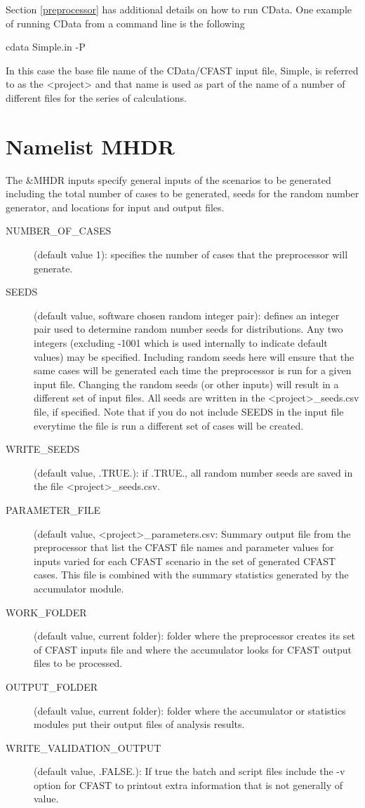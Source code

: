 \documentclass[12pt,twoside]{book}
\begin{document}
Section \ref{preprocessor} has additional details on how to run CData. One example of running CData from a command line is the following

\vspace{\baselineskip}
{\ct cdata Simple.in -P}
\vspace{\baselineskip}

In this case the base file name of the CData/CFAST input file, {\ct Simple}, is referred to as the {\ct <project>} and that name is used as part of the name of a number of different files for the series of calculations.

\section{Namelist MHDR}
\label{info:MHDR}

The {\ct \&MHDR} inputs specify general inputs of the scenarios to be generated including the total number of cases to be generated, seeds for the random number generator, and locations for input and output files.

\begin{description}
  \item[NUMBER\_OF\_CASES] (default value 1): specifies the number of cases that the preprocessor will generate.
  \item[SEEDS] (default value, software chosen random integer pair): defines an integer pair used to determine random number seeds for distributions. Any two integers (excluding -1001 which is used internally to indicate default values) may be specified. Including random seeds here will ensure that the same cases will be generated each time the preprocessor is run for a given input file. Changing the random seeds (or other inputs) will result in a different set of input files.  All seeds are written in the {\ct <project>\_seeds.csv} file, if specified. Note that if you do not include {\ct SEEDS} in the input file everytime the file is run a different set of cases will be created.
  \item[WRITE\_SEEDS] (default value, .TRUE.): if .TRUE., all random number seeds are saved in the file {\ct <project>\_seeds.csv}.
  \item[PARAMETER\_FILE] (default value, {\ct <project>\_parameters.csv}: Summary output file from the preprocessor that list the CFAST file names and parameter values for inputs varied for each CFAST scenario in the set of generated CFAST cases. This file is combined with the summary statistics generated by the accumulator module.
  \item[WORK\_FOLDER] (default value, current folder): folder where the preprocessor creates its set of CFAST inputs file and where the accumulator looks for CFAST output files to be processed.
  \item[OUTPUT\_FOLDER] (default value, current folder): folder where the accumulator or statistics modules put their output files of analysis results.
  \item[WRITE\_VALIDATION\_OUTPUT] (default value, .FALSE.): If true the batch and script files include the -v option for CFAST to printout extra information that is not generally of value.
\end{description}
\end{document}
